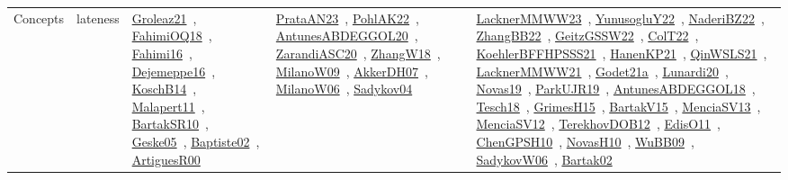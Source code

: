 {\begin{longtable}{lp{3cm}>{\raggedright\arraybackslash}p{6cm}>{\raggedright\arraybackslash}p{6cm}>{\raggedright\arraybackslash}p{8cm}}
Concepts & lateness & \href{works/Groleaz21.pdf}{Groleaz21}~\cite{Groleaz21}, \href{works/FahimiOQ18.pdf}{FahimiOQ18}~\cite{FahimiOQ18}, \href{works/Fahimi16.pdf}{Fahimi16}~\cite{Fahimi16}, \href{works/Dejemeppe16.pdf}{Dejemeppe16}~\cite{Dejemeppe16}, \href{works/KoschB14.pdf}{KoschB14}~\cite{KoschB14}, \href{works/Malapert11.pdf}{Malapert11}~\cite{Malapert11}, \href{works/BartakSR10.pdf}{BartakSR10}~\cite{BartakSR10}, \href{works/Geske05.pdf}{Geske05}~\cite{Geske05}, \href{works/Baptiste02.pdf}{Baptiste02}~\cite{Baptiste02}, \href{works/ArtiguesR00.pdf}{ArtiguesR00}~\cite{ArtiguesR00} & \href{works/PrataAN23.pdf}{PrataAN23}~\cite{PrataAN23}, \href{works/PohlAK22.pdf}{PohlAK22}~\cite{PohlAK22}, \href{works/AntunesABDEGGOL20.pdf}{AntunesABDEGGOL20}~\cite{AntunesABDEGGOL20}, \href{works/ZarandiASC20.pdf}{ZarandiASC20}~\cite{ZarandiASC20}, \href{works/ZhangW18.pdf}{ZhangW18}~\cite{ZhangW18}, \href{works/MilanoW09.pdf}{MilanoW09}~\cite{MilanoW09}, \href{works/AkkerDH07.pdf}{AkkerDH07}~\cite{AkkerDH07}, \href{works/MilanoW06.pdf}{MilanoW06}~\cite{MilanoW06}, \href{works/Sadykov04.pdf}{Sadykov04}~\cite{Sadykov04} & \href{works/LacknerMMWW23.pdf}{LacknerMMWW23}~\cite{LacknerMMWW23}, \href{works/YunusogluY22.pdf}{YunusogluY22}~\cite{YunusogluY22}, \href{works/NaderiBZ22.pdf}{NaderiBZ22}~\cite{NaderiBZ22}, \href{works/ZhangBB22.pdf}{ZhangBB22}~\cite{ZhangBB22}, \href{works/GeitzGSSW22.pdf}{GeitzGSSW22}~\cite{GeitzGSSW22}, \href{works/ColT22.pdf}{ColT22}~\cite{ColT22}, \href{works/KoehlerBFFHPSSS21.pdf}{KoehlerBFFHPSSS21}~\cite{KoehlerBFFHPSSS21}, \href{works/HanenKP21.pdf}{HanenKP21}~\cite{HanenKP21}, \href{works/QinWSLS21.pdf}{QinWSLS21}~\cite{QinWSLS21}, \href{works/LacknerMMWW21.pdf}{LacknerMMWW21}~\cite{LacknerMMWW21}, \href{works/Godet21a.pdf}{Godet21a}~\cite{Godet21a}, \href{works/Lunardi20.pdf}{Lunardi20}~\cite{Lunardi20}, \href{works/Novas19.pdf}{Novas19}~\cite{Novas19}, \href{works/ParkUJR19.pdf}{ParkUJR19}~\cite{ParkUJR19}, \href{works/AntunesABDEGGOL18.pdf}{AntunesABDEGGOL18}~\cite{AntunesABDEGGOL18}, \href{works/Tesch18.pdf}{Tesch18}~\cite{Tesch18}, \href{works/GrimesH15.pdf}{GrimesH15}~\cite{GrimesH15}, \href{works/BartakV15.pdf}{BartakV15}~\cite{BartakV15}, \href{works/MenciaSV13.pdf}{MenciaSV13}~\cite{MenciaSV13}, \href{works/MenciaSV12.pdf}{MenciaSV12}~\cite{MenciaSV12}, \href{works/TerekhovDOB12.pdf}{TerekhovDOB12}~\cite{TerekhovDOB12}, \href{works/EdisO11.pdf}{EdisO11}~\cite{EdisO11}, \href{works/ChenGPSH10.pdf}{ChenGPSH10}~\cite{ChenGPSH10}, \href{works/NovasH10.pdf}{NovasH10}~\cite{NovasH10}, \href{works/WuBB09.pdf}{WuBB09}~\cite{WuBB09}, \href{works/SadykovW06.pdf}{SadykovW06}~\cite{SadykovW06}, \href{works/Bartak02.pdf}{Bartak02}~\cite{Bartak02}\\

\end{longtable}}
